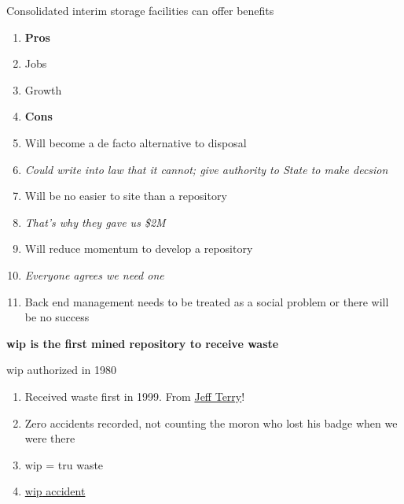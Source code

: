 \documentclass[aspectratio=1610,pdftex,dvipsnames,compress,xcolor={dvipsnames}]{beamer}
\newcommand{\acs}{\acrshort} %
\begin{document}
\begin{frame}{Consolidated interim storage facilities can offer benefits}
    \begin{enumerate}[series=outerlist,topsep=0pt,itemsep=5pt,leftmargin=*,label=(\arabic*)]
        \item[]\textbf{Pros}
        \item[]Jobs
        \item[]Growth
            \vspace{0.15in}
        \item[]\textbf{Cons}
        \item[]Will become a de facto alternative to disposal
        \item[]\textit{Could write into law that it cannot; give authority to State to make decsion}
        \item[]Will be no easier to site than a repository
        \item[]\textit{That's why they gave us \$2M}
        \item[]Will reduce momentum to develop a repository
        \item[]\textit{Everyone agrees we need one}
            \vspace{0.20in}
        \item[]Back end management needs to be treated as a social problem or there will be no success
    \end{enumerate}
\end{frame}


\begin{frame}[plain]{}
    \centering\LARGE\textbf{\acs{wip} is the first mined repository to receive waste}
\end{frame}


\addtocounter{framenumber}{-1} 
\begin{frame}{\acs{wip} authorized in 1980}
    \begin{enumerate}[topsep=0pt,itemsep=21pt,leftmargin=*,label=(\arabic*)]
        \item[]Received waste first in 1999. From \href{https://twitter.com/nuclear94}{Jeff Terry}!
        \item[]Zero accidents recorded, not counting the moron who lost his badge when we were there
        \item[]\acs{wip} = \acs{tru} waste
        \item[]\href{https://uidaho.pressbooks.pub/nuclearengineering/chapter/doe-waste-disposal-facilities/}{\acs{wip} accident}
    \end{enumerate}
\end{frame}
\end{document}

